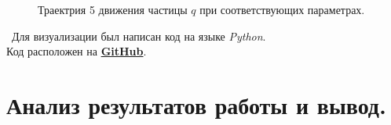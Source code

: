 \documentclass[a5paper, 10pt]{article}
\theoremstyle{definition}
\theoremstyle{plain}
\theoremstyle{remark}
\begin{document}
\begin{figure}[h!]
\caption{Траектрия 5 движения частицы $q$ при соответствующих параметрах.}
\end{figure}



\newpage

\newpage
\,
\newpage
Для визуализации был написан код на языке \textit{Python}. \\
Код расположен на \href{https://github.com/a-nechaeva/phys_project_2/blob/main/python_code/electric_move.py}{\textbf{GitHub}}.

\section{Анализ результатов работы и вывод.}
\end{document}
